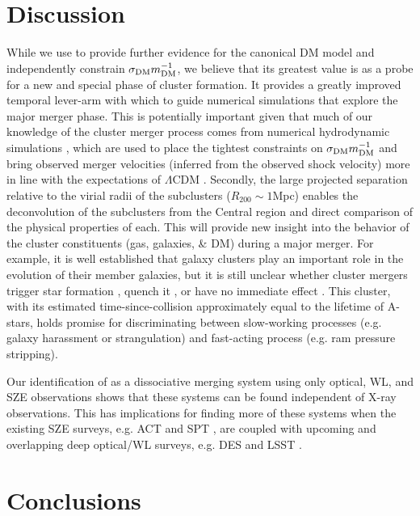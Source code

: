 \section{Discussion}

While we use  to provide further evidence for the canonical DM model and independently constrain $\sigma_{\rm DM}m^{-1}_{\rm DM}$, we believe that its greatest value is as a probe for a new and special phase of cluster formation.  
It provides a greatly improved temporal lever-arm with which to guide numerical simulations that explore the major merger phase.  
This is potentially important given that much of our knowledge of the cluster merger process comes from numerical hydrodynamic simulations \cite[e.g.][]{pool06}, which are used to place the tightest constraints on $\sigma_{\rm DM}m^{-1}_{\rm DM}$ \citep[$<0.7$\,cm$^2$\,g$^{-1}$;][]{rand08} and bring observed merger velocities (inferred from the observed shock velocity) more in line with the expectations of $\Lambda$CDM \citep{spri07,lee10}.
Secondly, the large projected separation relative to the virial radii of the subclusters ($R_{200} \sim 1$Mpc) enables the deconvolution of the subclusters from the Central region and direct comparison of the physical properties of each.
This will provide new insight into the behavior of the cluster constituents (gas, galaxies, \& DM) during a major merger.
For example, it is well established that galaxy clusters play an important role in the evolution of their member galaxies, but it is still unclear whether cluster mergers trigger star formation \citep[e.g.][]{mill03,owen05,ferr05,hwan09}, quench it \citep{pogg04}, or have no immediate effect \citep{chun10}.
This cluster, with its estimated time-since-collision approximately equal to the lifetime of A-stars, holds promise for discriminating between slow-working processes (e.g. galaxy harassment or strangulation) and fast-acting process (e.g. ram pressure stripping). 

Our identification of  as a dissociative merging system using only optical, WL, and SZE observations shows that these systems can be found independent of X-ray observations.
This has implications for finding more of these systems when the existing SZE surveys, e.g. ACT \citep{ACT} and SPT \citep{SPT}, are coupled with upcoming and overlapping deep optical/WL surveys, e.g. DES \citep{DES} and LSST \citep{LSST}.

\section{Conclusions}

